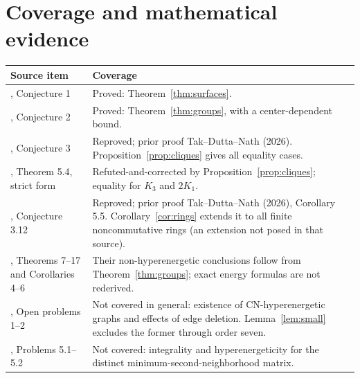 \documentclass[11pt]{article}
\begin{document}
\section{Coverage and mathematical evidence}
\begin{center}\small
\begin{tabular}{@{}p{}p{}@{}}
\toprule Source item & Coverage\\\midrule
\cite{NFDS}, Conjecture 1 & Proved: Theorem~\ref{thm:surfaces}.\\[3pt]
\cite{NFDS}, Conjecture 2 & Proved: Theorem~\ref{thm:groups}, with a center-dependent bound.\\[3pt]
\cite{NFDS}, Conjecture 3 & Reproved; prior proof Tak--Dutta--Nath (2026).
Proposition~\ref{prop:cliques} gives all equality cases.\\[3pt]
\cite{TDN}, Theorem 5.4, strict form & Refuted-and-corrected by
Proposition~\ref{prop:cliques}; equality for $K_3$ and $2K_1$.\\[3pt]
\cite{FN}, Conjecture 3.12 & Reproved; prior proof Tak--Dutta--Nath (2026),
Corollary 5.5. Corollary~\ref{cor:rings} extends it to all finite
noncommutative rings (an extension not posed in that source).\\[3pt]
\cite{NFDS}, Theorems 7--17 and Corollaries 4--6 & Their non-hyperenergetic
conclusions follow from Theorem~\ref{thm:groups}; exact energy formulas
are not rederived.\\[3pt]
\cite{ASG}, Open problems 1--2 & Not covered in general: existence of
CN-hyperenergetic graphs and effects of edge deletion. Lemma~\ref{lem:small}
excludes the former through order seven.\\[3pt]
\cite{TDN}, Problems 5.1--5.2 & Not covered: integrality and hyperenergeticity
for the distinct minimum-second-neighborhood matrix.\\
\bottomrule\end{tabular}\end{center}
\end{document}
